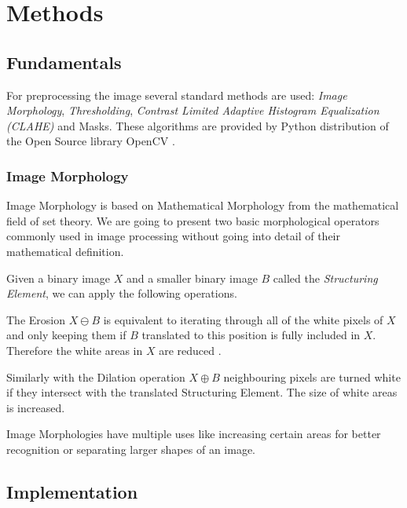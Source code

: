 
\section{Methods}

\subsection{Fundamentals}

For preprocessing the image several standard methods are used: \textit{Image
Morphology}, \textit{Thresholding}, \textit{Contrast Limited Adaptive Histogram
Equalization (CLAHE)} and Masks. These algorithms are provided by Python
distribution of the Open Source library OpenCV \cite{opencv_library}.

\subsubsection{Image Morphology}

Image Morphology is based on Mathematical Morphology from the mathematical field
of set theory. We are going to present two basic morphological operators
commonly used in image processing without going into detail of their mathematical
definition.

Given a binary image $X$ and a smaller binary image $B$ called the
\textit{Structuring Element}, we can apply the following operations.

The Erosion $X \ominus B$ is equivalent to iterating through all of the white
pixels of $X$ and only keeping them if $B$ translated to this position is fully
included in $X$. Therefore the white areas in $X$ are reduced \cite{Smith1997}.

Similarly with the Dilation operation $X \oplus B$ neighbouring pixels are
turned white if they intersect with the translated Structuring Element. The size
of white areas is increased.

Image Morphologies have multiple uses like increasing certain areas for better
recognition or separating larger shapes of an image.


\subsection{Implementation}


